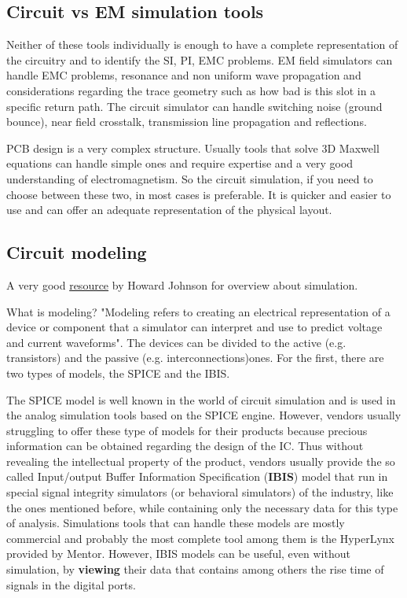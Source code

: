 \documentclass[final]{cubedoc}
\begin{document}
	\subsection{Circuit vs EM simulation tools}
	
	Neither of these tools individually is enough to have a complete representation of the circuitry and to identify the SI, PI, EMC problems. EM field simulators can handle EMC problems, resonance and non uniform wave propagation and considerations regarding the trace geometry such as how bad is this slot in a specific return path. The circuit simulator can handle switching noise (ground bounce), near field crosstalk, transmission line propagation and reflections.	
	
	PCB design is a very complex structure. Usually tools that solve 3D Maxwell equations can handle simple ones and require expertise and a very good understanding of electromagnetism. So the circuit simulation, if you need to choose between these two, in most cases is preferable. It is quicker and easier to use and can offer an adequate representation of the physical layout.
	
	\subsection{Circuit modeling}
	
	A very good \href{http://www.sigcon.com/Pubs/straight/planningsi.htm}{resource} by Howard Johnson for overview about simulation.
	
	What is modeling? "Modeling refers to creating an electrical representation of a device or component that a simulator can interpret and use to predict voltage and current waveforms". The devices can be divided to the active (e.g. transistors) and the passive (e.g. interconnections)ones. For the first, there are two types of models, the SPICE and the IBIS.
	
	The SPICE model is well known in the world of circuit simulation and is used in the analog simulation tools based on the SPICE engine. However, vendors usually struggling to offer these type of models for their products because precious information can be obtained regarding the design of the IC. Thus without revealing the intellectual property of the product, vendors usually provide the so called Input/output Buffer Information Specification (\textbf{IBIS}) model that run in special signal integrity simulators (or behavioral simulators) of the industry, like the ones mentioned before, while containing only the necessary data for this type of analysis. Simulations tools that can handle these models are mostly commercial and probably the most complete tool among them is the HyperLynx provided by Mentor.
	However, IBIS models can be useful, even without simulation, by \textbf{viewing} their data that contains among others the rise time of signals in the digital ports.
	
\end{document}
